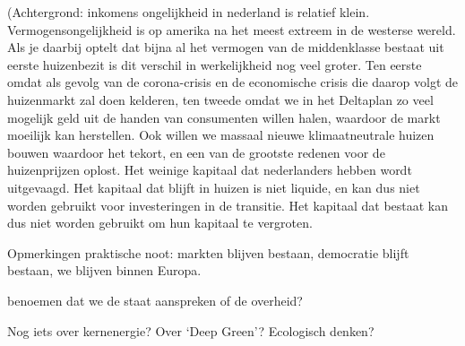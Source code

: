 (Achtergrond: inkomens ongelijkheid in nederland is relatief klein. Vermogensongelijkheid is op amerika na het meest extreem in de westerse wereld. Als je daarbij optelt dat bijna al het vermogen van de middenklasse bestaat uit eerste huizenbezit is dit verschil in werkelijkheid nog veel groter. Ten eerste omdat als gevolg van de corona-crisis en de economische crisis die daarop volgt de huizenmarkt zal doen kelderen, ten tweede omdat we in het Deltaplan zo veel mogelijk geld uit de handen van consumenten willen halen, waardoor de markt moeilijk kan herstellen. Ook willen we massaal nieuwe klimaatneutrale huizen bouwen waardoor het tekort, en een van de grootste redenen voor de huizenprijzen oplost. Het weinige kapitaal dat nederlanders hebben wordt uitgevaagd. Het kapitaal dat blijft in huizen is niet liquide, en kan dus niet worden gebruikt voor investeringen in de transitie. Het kapitaal dat bestaat kan dus niet worden gebruikt om hun kapitaal te vergroten. 

Opmerkingen
praktische noot: markten blijven bestaan, democratie blijft bestaan, we blijven binnen Europa.

benoemen dat we de staat aanspreken of de overheid?

Nog iets over kernenergie? Over ‘Deep Green’? Ecologisch denken?
